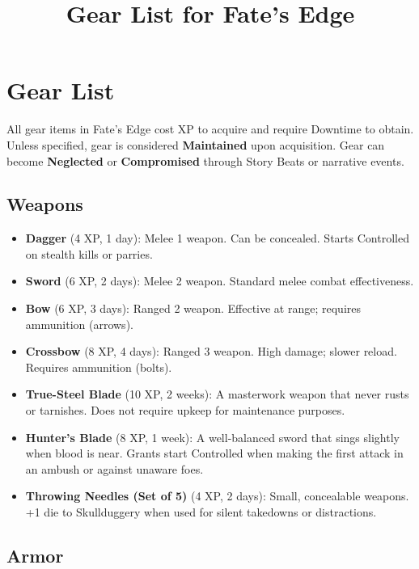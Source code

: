 \documentclass[12pt]{article}
\title{Gear List for Fate's Edge}
\author{}
\date{}
\begin{document}
\maketitle

\section*{Gear List}

All gear items in Fate's Edge cost XP to acquire and require Downtime to obtain. Unless specified, gear is considered \textbf{Maintained} upon acquisition. Gear can become \textbf{Neglected} or \textbf{Compromised} through Story Beats or narrative events.

\subsection*{Weapons}

\begin{itemize}[leftmargin=*]
  \item \textbf{Dagger} (4 XP, 1 day): Melee 1 weapon. Can be concealed. Starts Controlled on stealth kills or parries.
  \item \textbf{Sword} (6 XP, 2 days): Melee 2 weapon. Standard melee combat effectiveness.
  \item \textbf{Bow} (6 XP, 3 days): Ranged 2 weapon. Effective at range; requires ammunition (arrows).
  \item \textbf{Crossbow} (8 XP, 4 days): Ranged 3 weapon. High damage; slower reload. Requires ammunition (bolts).
  \item \textbf{True-Steel Blade} (10 XP, 2 weeks): A masterwork weapon that never rusts or tarnishes. Does not require upkeep for maintenance purposes.
  \item \textbf{Hunter's Blade} (8 XP, 1 week): A well-balanced sword that sings slightly when blood is near. Grants start Controlled when making the first attack in an ambush or against unaware foes.
  \item \textbf{Throwing Needles (Set of 5)} (4 XP, 2 days): Small, concealable weapons. +1 die to Skullduggery when used for silent takedowns or distractions.
\end{itemize}

\subsection*{Armor}
\end{document}
